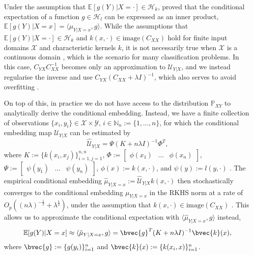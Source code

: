 \documentclass{article}
\begin{document}
	Under the assumption that $\mathbb{E}[g(Y) | X = \cdot] \in \mathcal{H}_{k}$, \citet[Theorem 4]{song2009hilbert} proved that the conditional expectation of a function $g \in \mathcal{H}_{l}$ can be expressed as an inner product, $\mathbb{E}[g(Y) | X = x] = \langle \mu_{Y | X = x}, g \rangle$. While the assumptions that $\mathbb{E}[g(Y) | X = \cdot] \in \mathcal{H}_{k}$ and $k(x, \cdot) \in \mathrm{image}(C_{XX})$ hold for finite input domains $\mathcal{X}$ and characteristic kernels $k$, it is not necessarily true when $\mathcal{X}$ is a continuous domain \citep{fukumizu2004dimensionality}, which is the scenario for many classification problems. In this case, $C_{YX} C_{XX}^{-1}$ becomes only an approximation to $\mathcal{U}_{Y | X}$, and we instead regularise the inverse and use $C_{YX} (C_{XX} + \lambda I)^{-1}$, which also serves to avoid overfitting \citep{song2013kernel}.
	
	On top of this, in practice we do not have access to the distribution $\mathbb{P}_{X Y}$ to analytically derive the conditional embedding. Instead, we have a finite collection of observations $\{x_{i}, y_{i}\} \in \mathcal{X} \times \mathcal{Y}$, $i \in \mathbb{N}_{n} := \{1, \dots, n\}$, for which the conditional embedding map $\mathcal{U}_{Y | X}$ can be estimated by
	\begin{equation}
		\hat{\mathcal{U}}_{Y | X} = \Psi (K + n \lambda I)^{-1} \Phi^{T},
	\label{eq:empirical_conditional_embedding}
	\end{equation}
	where $K := \{k(x_{i}, x_{j})\}_{i = 1, j = 1}^{n, n}$, $\Phi := \begin{bmatrix} \phi(x_{1}) & \dots & \phi(x_{n}) \end{bmatrix}$, $\Psi := \begin{bmatrix} \psi(y_{1}) & \dots & \psi(y_{n}) \end{bmatrix}$, $\phi(x) := k(x, \cdot)$, and $\psi(y) := l(y, \cdot)$ \citep{song2013kernel}. The empirical conditional embedding $\hat{\mu}_{Y | X = x} := \hat{\mathcal{U}}_{Y | X} k(x, \cdot)$ then stochastically converges to the conditional embedding $\mu_{Y | X = x}$ in the RKHS norm at a rate of $O_{p}((n \lambda)^{-\frac{1}{2}} + \lambda^{\frac{1}{2}})$, under the assumption that $k(x, \cdot) \in \mathrm{image}(C_{XX})$ \cite[Theorem 6]{song2009hilbert}. This allows us to approximate the conditional expectation with $\langle \hat{\mu}_{Y | X = x}, g \rangle$ instead, 
	\begin{equation}
		\mathbb{E}[g(Y) | X = x] \approx \langle \hat{\mu}_{Y | X = x}, g \rangle = \bvec{g}^{T} (K + n \lambda I)^{-1} \bvec{k}(x),
	\label{eq:empirical_conditional_expectation}
	\end{equation}
	where $\bvec{g} := \{g(y_{i})\}_{i = 1}^{n}$ and $\bvec{k}(x) := \{k(x_{i}, x)\}_{i = 1}^{n}$.
	
\end{document}
